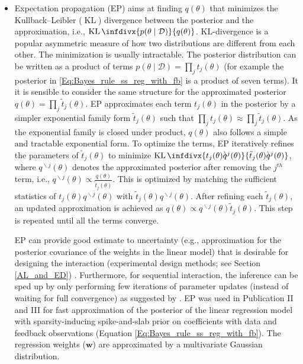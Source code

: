 \documentclass[dissertation,math,vertlayout,pdfa,colorlinks]{aaltoseries}
\newcommand{\bw}{\bm{w}}
\newcommand{\bD}{\mathcal{D}}
\DeclareMathOperator{\KLt}{KL}
\newcommand{\KL}{\KLt\infdivx}
\begin{document}
\begin{itemize}
	\item Expectation propagation (EP) \cite{minka2001expectation} aims at finding $q(\theta)$ that minimizes the Kullback–Leibler ($\KLt$) divergence between the posterior and the approximation, i.e., $\KL{p(\theta \mid \bD)}{q(\theta)}$. KL-divergence is a popular asymmetric measure of how two distributions are different from each other. The minimization is usually intractable. The posterior distribution can be written as a product of terms $p(\theta \mid \bD) = \prod_{j} t_j(\theta)$ (for example the posterior in \ref{Eq:Bayes_rule_ss_reg_with_fb} is a product of seven terms). It it is sensible to consider the same structure for the approximated posterior $q(\theta) = \prod_{j} \tilde{t}_j(\theta)$. %
	EP approximates each term $t_j(\theta)$ in the posterior by a simpler exponential family form $\tilde{t}_j(\theta)$ such that $\prod_{j} t_j(\theta) \approx \prod_{j}\tilde{t}_j(\theta)$. As the exponential family is closed under product, $q(\theta)$ also follows a simple and tractable exponential form. To optimize the terms, EP iteratively refines the parameters of $\tilde{t}_j(\theta)$ to minimize $\KL{t_j(\theta) q^{\!\!\!\backslash j}(\theta)} {\tilde{t}_j(\theta) q^{\!\!\!\backslash j}(\theta)}$, where $q^{\!\!\!\backslash j}(\theta)$ denotes the approximated posterior after removing the $j^{th}$ term, i.e.,  $q^{\!\!\!\backslash j}(\theta) \propto \frac{q(\theta)}{\tilde{t}_j(\theta)}$. This is optimized by matching the sufficient statistics of $t_j(\theta) q^{\!\!\!\backslash j}(\theta)$ with $\tilde{t}_j(\theta) q^{\!\!\!\backslash j}(\theta)$. After refining each $\tilde{t}_j(\theta)$, an updated approximation is achieved as $q(\theta)\propto q^{\!\!\!\backslash j}(\theta) \tilde{t}_j(\theta)$. This step is repeated until all the terms converge.  \cite{hernandez2013generalized,Lobato2015ML,Tomi_P_thesis}
	
	EP can provide good estimate to uncertainty (e.g., approximation for the posterior covariance of the weights in the linear model) that is desirable for designing the interaction (experimental design methods; see Section \ref{AL_and_ED}) \cite{hernandez2013generalized}. Furthermore, for sequential interaction, the inference can be sped up by only performing few iterations of parameter updates (instead of waiting for full convergence) as suggested by \cite{seeger2008bayesian}. EP was used in Publication II and III for fast approximation of the posterior of the linear regression model with sparsity-inducing spike-and-slab prior on coefficients with data and feedback observations (Equation \ref{Eq:Bayes_rule_ss_reg_with_fb}). The regression weights ($\bw$) are approximated by a multivariate Gaussian distribution. 
	

\end{itemize}
\end{document}

